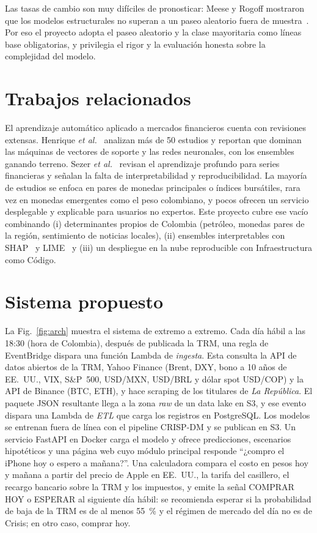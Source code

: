 \documentclass[conference]{IEEEtran}
\begin{document}
Las tasas de cambio son muy difíciles de pronosticar: Meese y Rogoff mostraron que los modelos estructurales no superan a un paseo aleatorio fuera de muestra~\cite{meese1983}. Por eso el proyecto adopta el paseo aleatorio y la clase mayoritaria como líneas base obligatorias, y privilegia el rigor y la evaluación honesta sobre la complejidad del modelo.

\section{Trabajos relacionados}
El aprendizaje automático aplicado a mercados financieros cuenta con revisiones extensas. Henrique \emph{et al.}~\cite{henrique2019} analizan más de 50 estudios y reportan que dominan las máquinas de vectores de soporte y las redes neuronales, con los ensembles ganando terreno. Sezer \emph{et al.}~\cite{sezer2020} revisan el aprendizaje profundo para series financieras y señalan la falta de interpretabilidad y reproducibilidad. La mayoría de estudios se enfoca en pares de monedas principales o índices bursátiles, rara vez en monedas emergentes como el peso colombiano, y pocos ofrecen un servicio desplegable y explicable para usuarios no expertos. Este proyecto cubre ese vacío combinando (i) determinantes propios de Colombia (petróleo, monedas pares de la región, sentimiento de noticias locales), (ii) ensembles interpretables con SHAP~\cite{lundberg2017} y LIME~\cite{ribeiro2016} y (iii) un despliegue en la nube reproducible con Infraestructura como Código.

\section{Sistema propuesto}
La Fig.~\ref{fig:arch} muestra el sistema de extremo a extremo. Cada día hábil a las 18:30 (hora de Colombia), después de publicada la TRM, una regla de EventBridge dispara una función Lambda de \emph{ingesta}. Esta consulta la API de datos abiertos de la TRM, Yahoo Finance (Brent, DXY, bono a 10 años de EE.~UU., VIX, S\&P~500, USD/MXN, USD/BRL y dólar spot USD/COP) y la API de Binance (BTC, ETH), y hace scraping de los titulares de \emph{La República}. El paquete JSON resultante llega a la zona \emph{raw} de un data lake en S3, y ese evento dispara una Lambda de \emph{ETL} que carga los registros en PostgreSQL. Los modelos se entrenan fuera de línea con el pipeline CRISP-DM y se publican en S3. Un servicio FastAPI en Docker carga el modelo y ofrece predicciones, escenarios hipotéticos y una página web cuyo módulo principal responde ``¿compro el iPhone hoy o espero a mañana?''. Una calculadora compara el costo en pesos hoy y mañana a partir del precio de Apple en EE.~UU., la tarifa del casillero, el recargo bancario sobre la TRM y los impuestos, y emite la señal COMPRAR HOY o ESPERAR al siguiente día hábil: se recomienda esperar si la probabilidad de baja de la TRM es de al menos 55~\% y el régimen de mercado del día no es de Crisis; en otro caso, comprar hoy.
\end{document}
